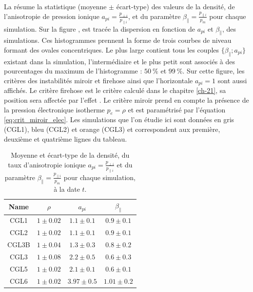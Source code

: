  La  résume la statistique (moyenne $\pm$ écart-type) des valeurs de la densité, de l'anisotropie de pression ionique $a_{pi} = \frac{p_{\perp i}}{p_{\parallel i}}$, et du paramètre $\beta_{\parallel} = \frac{p_{\parallel i}}{p_{m}}$ pour chaque simulation. Sur la figure , est tracée la dispersion en fonction de $a_{pi}$ et $\beta_{\parallel}$, des simulations. Ces histogrammes  prennent la forme de trois courbes de niveau formant des ovales concentriques. Le plus large contient tous les couples $\{\beta_{\parallel};a_{pi}\}$ existant dans la simulation, l'intermédiaire et le plus petit sont associés à des pourcentages du maximum de l'histogramme : $\SI{50}{\%}$ et $\SI{99}{\%}$. Sur cette figure, les critères des instabilités miroir et firehose ainsi que l'horizontale $a_{pi} =  1$ sont aussi affichés. Le critère firehose est le critère calculé dans le chapitre \ref{ch-21}, sa position sera affectée par l'effet . Le critère miroir prend en compte la présence de la pression électronique isotherme $p_e = \rho$ et est paramétrisé par l'équation \eqref{eq:crit_miroir_elec}. Les simulations que l'on étudie ici sont données en 
 gris (CGL1), bleu (CGL2) et orange (CGL3) et correspondent aux première, deuxième et quatrième lignes du tableau. 
  \begin{table}[!ht]
 \begin{center}
 \begin{tabular}{ c|c|c|c } 
 Name & $\rho$ & $a_{pi}$  & $\beta_{\parallel}$\\
 \hline
 CGL1 & $\num{1}\pm \num{0.02}$ & $\num{1.1}\pm \num{0.1}$ & $\num{0.9}\pm \num{0.1}$ \\
 CGL2 & $\num{1}\pm \num{0.02}$ & $\num{1.1}\pm \num{0.1}$ & $\num{0.9}\pm \num{0.1}$   \\
 CGL3B & $\num{1}\pm \num{0.04}$ & $\num{1.3}\pm \num{0.3}$ & $\num{0.8}\pm \num{0.2}$   \\
 CGL3 & $\num{1}\pm \num{0.08}$ & $\num{2.2}\pm \num{0.5}$ & $\num{0.6}\pm \num{0.3}$  \\
 CGL5 & $\num{1}\pm \num{0.02}$ & $\num{2.1}\pm \num{0.1}$ & $\num{0.6}\pm \num{0.1}$  \\
 CGL6 & $\num{1}\pm \num{0.02}$ & $\num{3.97}\pm \num{0.5}$ & $\num{1.01}\pm \num{0.2}$  \\
 \end{tabular}
 \caption{Moyenne et écart-type de la densité, du taux d'anisotropie ionique $a_{pi} = \frac{p_{\perp i}}{p_{\parallel i}}$ et du paramètre $\beta_{\parallel} = \frac{p_{\parallel i}}{p_{m}}$ pour chaque simulation, à la date $t$. }\label{tab:stat_CGL}
 \end{center}
 \end{table}
